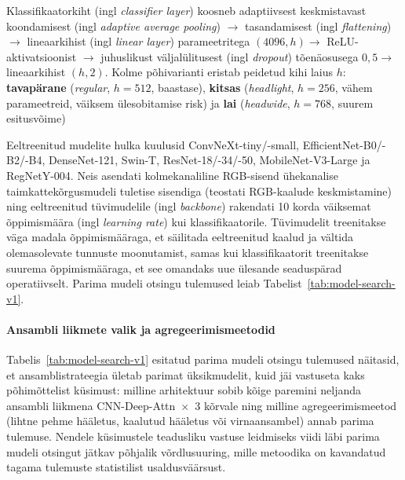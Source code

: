     Klassifikaatorkiht (ingl \textit{classifier layer}) koosneb adaptiivsest keskmistavast koondamisest (ingl \textit{adaptive average pooling}) $\to$ tasandamisest (ingl \textit{flattening}) $\to$ lineaarkihist (ingl \textit{linear layer}) parameetritega $(4096, h) \to$ ReLU-aktivatsioonist $\to$ juhuslikust väljalülitusest (ingl \textit{dropout}) tõenäosusega $0{,}5 \to$ lineaarkihist $(h, 2)$. Kolme põhivarianti eristab peidetud kihi laius $h$: \textbf{tavapärane} (\textit{regular}, $h{=}512$, baastase), \textbf{kitsas} (\textit{headlight}, $h{=}256$, vähem parameetreid, väiksem ülesobitamise risk) ja \textbf{lai} (\textit{headwide}, $h{=}768$, suurem esitusvõime) 
        
    Eeltreenitud mudelite hulka kuulusid ConvNeXt-tiny/-small, EfficientNet-B0/-B2/-B4, DenseNet-121, Swin-T, ResNet-18/-34/-50, MobileNet-V3-Large ja RegNetY-004. Neis asendati kolmekanaliline RGB-sisend ühekanalise taimkattekõrgusmudeli tuletise sisendiga (teostati RGB-kaalude keskmistamine) ning eeltreenitud tüvimudelile (ingl \textit{backbone}) rakendati 10 korda väiksemat õppimismäära (ingl \textit{learning rate}) kui klassifikaatorile. Tüvimudelit treenitakse väga madala õppimismääraga, et säilitada eeltreenitud kaalud ja vältida olemasolevate tunnuste moonutamist, samas kui klassifikaatorit treenitakse suurema õppimismääraga, et see omandaks uue ülesande seaduspärad operatiivselt. Parima mudeli otsingu tulemused leiab Tabelist~\ref{tab:model-search-v1}.


    \paragraph{Ansambli liikmete valik ja agregeerimismeetodid}

    Tabelis~\ref{tab:model-search-v1} esitatud parima mudeli otsingu tulemused näitasid, et ansamblistrateegia ületab parimat üksikmudelit, kuid jäi vastuseta kaks põhimõttelist küsimust: milline arhitektuur sobib kõige paremini neljanda ansambli liikmena CNN-Deep-Attn~$\times$~3 kõrvale ning milline agregeerimismeetod (lihtne pehme hääletus, kaalutud hääletus või virnaansambel) annab parima tulemuse. Nendele küsimustele teadusliku vastuse leidmiseks viidi läbi parima mudeli otsingut jätkav põhjalik võrdlusuuring, mille metoodika on kavandatud tagama tulemuste statistilist usaldusväärsust.

